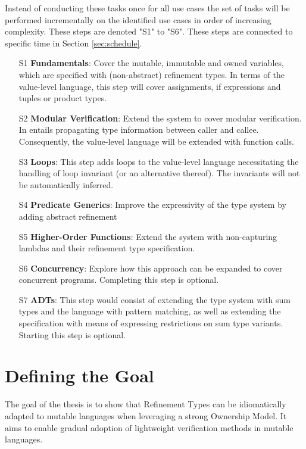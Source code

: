 \documentclass[11pt]{article}
\begin{document}
Instead of conducting these tasks once for all use cases the set of tasks will be performed incrementally on the identified use cases in order of increasing complexity. These steps are denoted "S1" to "S6". These steps are connected to specific time in Section \ref{sec:schedule}.

\begin{itemize}
	\item[S1] \textbf{Fundamentals}: Cover the mutable, immutable and owned variables, which are specified with (non-abstract) refinement types. In terms of the value-level language, this step will cover assignments, if expressions and tuples or product types.
	\item[S2] \textbf{Modular Verification}: Extend the system to cover modular verification. In entails propagating type information between caller and callee. Consequently, the value-level language will be extended with function calls.
	\item[S3] \textbf{Loops}: This step adds loops to the value-level language necessitating the handling of loop invariant (or an  alternative thereof). The invariants will not be automatically inferred.
	\item[S4] \textbf{Predicate Generics}: Improve the expressivity of the type system by adding abstract refinement
	\item[S5] \textbf{Higher-Order Functions}: Extend the system with non-capturing lambdas and their refinement type specification.
	\item[S6] \textbf{Concurrency}: Explore how this approach can be expanded to cover concurrent programs. Completing this step is optional.
	\item[S7] \textbf{ADTs}: This step would consist of extending the type system with sum types and the language with pattern matching, as well as extending the specification with means of expressing restrictions on sum type variants. Starting this step is optional.
\end{itemize}

\section{Defining the Goal}

The goal of the thesis is to show that Refinement Types can be idiomatically adapted to mutable languages when leveraging a strong Ownership Model. It aims to enable gradual adoption of lightweight verification methods in mutable languages.
\end{document}
